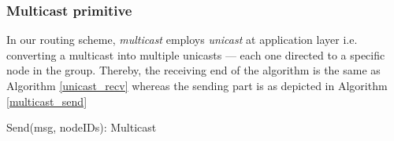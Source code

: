 \subsubsection{Multicast primitive}

In our routing scheme,  \emph{multicast} employs \emph{unicast} at application layer i.e. converting a multicast into multiple unicasts --- each one directed to a specific node in the group. Thereby, the receiving end of the algorithm is the same as Algorithm \ref{unicast_recv} whereas the sending part is as depicted in Algorithm \ref{multicast_send} 

\begin{algorithm}
\caption{Send(msg, nodeIDs): Multicast} 
\label{multicast_send}
\DontPrintSemicolon
{}
\end{algorithm}
